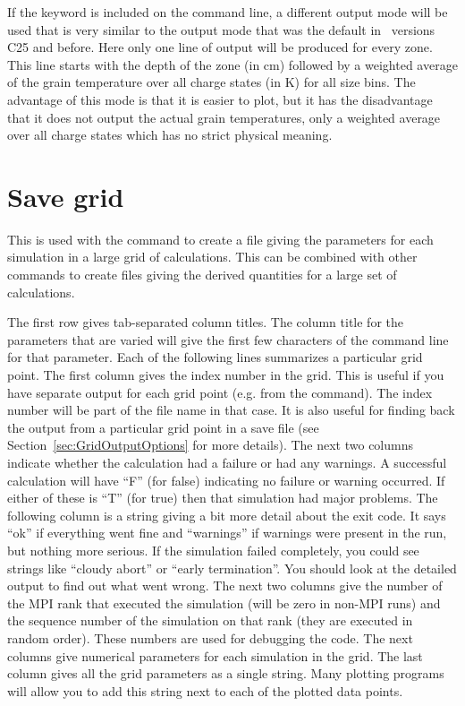 If the keyword  is included on the command line, a
different output mode will be used that is very similar to the output mode
that was the default in \Cloudy\ versions C25 and before. Here only one line
of output will be produced for every zone. This line starts with the depth of
the zone (in cm) followed by a weighted average of the grain temperature over
all charge states (in K) for all size bins. The advantage of this mode is that
it is easier to plot, but it has the disadvantage that it does not output the
actual grain temperatures, only a weighted average over all charge states
which has no strict physical meaning.

\section{Save grid}
\label{sec:save:grid}

This is used with the  command to
create a file giving the parameters for each simulation in a large grid
of calculations.  This can be combined with other  commands to create
files giving the derived quantities for a large set of calculations.

The first row gives tab-separated column titles.  The column title for the parameters
that are varied will give the first few characters of the command line for
that parameter.  Each of the following lines summarizes a particular grid point.  The
first column gives the index number in the grid. This is useful if you
have separate output for each grid point (e.g. from the 
command). The index number will be part of the file name in that case. It is
also useful for finding back the output from a particular grid point in a
save file (see Section~\ref{sec:GridOutputOptions} for more details).
The next two columns indicate whether the calculation had a failure or had any
warnings.  A successful calculation will have ``F'' (for false) indicating
no failure or warning occurred.  If either of these is ``T'' (for true) then
that simulation had major problems. The following column is a string giving
a bit more detail about the exit code. It says ``ok'' if everything went fine
and ``warnings'' if warnings were present in the run, but nothing more serious.
If the simulation failed completely, you could see strings like ``cloudy abort''
or ``early termination''. You should look at the detailed output
to find out what went wrong. The next two columns give the number of the
MPI rank that executed the simulation (will be zero in non-MPI runs) and the sequence
number of the simulation on that rank (they are executed in random order). These
numbers are used for debugging the code. The next columns give numerical parameters for
each simulation in the grid.  The last column gives all the grid parameters
as a single string.  Many plotting programs will allow you to add this string
next to each of the plotted data points.

